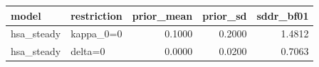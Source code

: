 \begin{tabular}{llrrr}
\toprule
model & restriction & prior\_mean & prior\_sd & sddr\_bf01 \\
\midrule
hsa\_steady & kappa\_0=0 & 0.1000 & 0.2000 & 1.4812 \\
hsa\_steady & delta=0 & 0.0000 & 0.0200 & 0.7063 \\
\bottomrule
\end{tabular}
